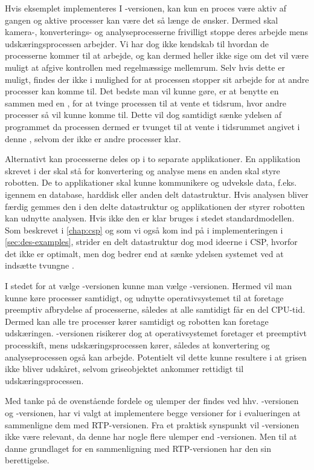 Hvis eksemplet implementeres I -versionen, kan kun  en proces være aktiv af gangen og aktive processer kan være det så længe de ønsker. Dermed skal kamera-, konverterings- og analyseprocesserne frivilligt stoppe deres arbejde mens  udskæringsprocessen arbejder.  Vi har dog ikke kendskab til hvordan de  processerne kommer til at arbejde, og kan dermed heller ikke sige om det vil være muligt at afgive kontrollen med regelmæssige mellemrum. Selv hvis dette er muligt, findes der ikke i \pycsp mulighed for at processen stopper sit arbejde for at andre  processer kan komme til. Det bedste man vil kunne gøre, er at benytte en   sammen med en , for at tvinge processen til at vente et tidsrum, hvor andre processer så vil kunne komme til. Dette vil dog samtidigt sænke ydelsen af programmet da processen dermed er tvunget til at vente i tidsrummet angivet i denne , selvom der ikke er andre processer klar. 

Alternativt kan processerne deles op i to separate applikationer. En applikation skrevet i \pycsp der skal stå for konvertering og analyse mens en anden skal styre robotten. De to applikationer skal kunne kommunikere og  udveksle data, f.eks. igennem en database, harddisk eller anden delt datastruktur. Hvis analysen bliver færdig gemmes den i den delte datastruktur og applikationen der styrer robotten kan udnytte analysen. Hvis ikke den er klar bruges i stedet standardmodellen. Som beskrevet i \autoref{chap:csp} og som vi også kom ind på i implementeringen i \autoref{sec:des-examples}, strider en delt datastruktur dog mod ideerne i CSP, hvorfor det ikke er optimalt, men dog bedrer end at sænke ydelsen systemet ved at indsætte tvungne .

I stedet for at vælge -versionen kunne man vælge -versionen. Hermed vil man kunne køre processer samtidigt, og udnytte operativsystemet til at foretage preemptiv afbrydelse af processerne, således at alle samtidigt får en del CPU-tid. Dermed kan alle tre processer kører samtidigt og robotten kan foretage udskæringen. -versionen risikerer dog at operativsystemet foretager et preemptivt processkift, mens udskæringsprocessen kører, således at konvertering og  analyseprocessen også kan arbejde. Potentielt vil dette kunne resultere i at grisen ikke bliver udskåret, selvom griseobjektet ankommer rettidigt til udskæringsprocessen.

Med tanke på de ovenstående fordele og ulemper der findes ved hhv.  -versionen og -versionen,  har vi valgt at implementere begge versioner for i evalueringen at sammenligne dem med RTP-versionen. Fra et praktisk synspunkt vil -versionen ikke være relevant, da denne har nogle flere ulemper end -versionen. Men til at danne grundlaget for en sammenligning med RTP-versionen har den sin berettigelse.

